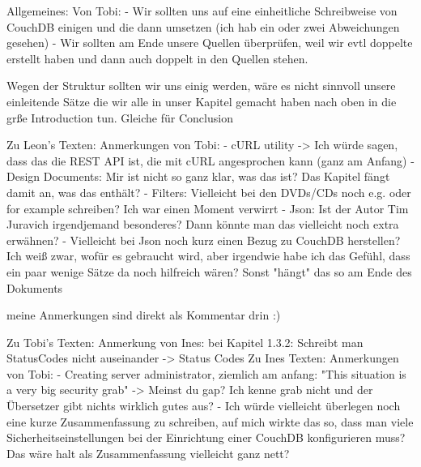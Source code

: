 Allgemeines:
Von Tobi:
- Wir sollten uns auf eine einheitliche Schreibweise von CouchDB einigen und die dann umsetzen (ich hab ein oder zwei Abweichungen gesehen)
- Wir sollten am Ende unsere Quellen überprüfen, weil wir evtl doppelte erstellt haben und dann auch doppelt in den Quellen stehen. 

Wegen der Struktur sollten wir uns einig werden, wäre es nicht sinnvoll unsere einleitende Sätze  die wir alle in unser Kapitel gemacht haben nach oben in die grße Introduction tun. Gleiche für Conclusion

Zu Leon's Texten:
Anmerkungen von Tobi:
- cURL utility -> Ich würde sagen, dass das die REST API ist, die mit cURL angesprochen kann (ganz am Anfang)
- Design Documents: Mir ist nicht so ganz klar, was das ist? Das Kapitel fängt damit an, was das enthält?
- Filters: Vielleicht bei den DVDs/CDs noch e.g. oder for example schreiben? Ich war einen Moment verwirrt
- Json: Ist der Autor Tim Juravich irgendjemand besonderes? Dann könnte man das vielleicht noch extra erwähnen?
- Vielleicht bei Json noch kurz einen Bezug zu CouchDB herstellen? Ich weiß zwar, wofür es gebraucht wird, aber irgendwie habe ich das Gefühl, dass ein paar wenige Sätze da noch hilfreich wären? Sonst "hängt" das so am Ende des Dokuments

meine Anmerkungen sind direkt als Kommentar drin :)

Zu Tobi's Texten:
Anmerkung von Ines:
bei Kapitel 1.3.2: Schreibt man StatusCodes nicht auseinander -> Status Codes
Zu Ines Texten:
Anmerkungen von Tobi:
- Creating server administrator, ziemlich am anfang: "This situation is a very big security grab" -> Meinst du gap? Ich kenne grab nicht und der Übersetzer gibt nichts wirklich gutes aus?
- Ich würde vielleicht überlegen noch eine kurze Zusammenfassung zu schreiben, auf mich wirkte das so, dass man viele Sicherheitseinstellungen bei der Einrichtung einer CouchDB konfigurieren muss? Das wäre halt als Zusammenfassung vielleicht ganz nett?




